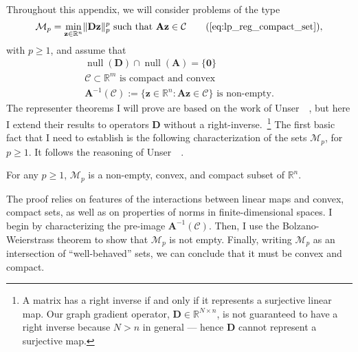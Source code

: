 Throughout this appendix, we will consider problems of the type
\begin{equation}
    \mathcal{M}_p = \underset{\mathbf{z} \in \mathbb{R}^{n}}{\min} \| \mathbf{D z} \|_p^p \text{ such that } \mathbf{Az} \in \mathcal{C} \tag{\ref{eq:lp_reg_compact_set}},
\end{equation}
with $p \geq 1$, and assume that
\begin{align}
    \tag{A1} \label{ass:representer_null} \operatorname{null} \left ( \mathbf{D} \right ) \cap \operatorname{null} \left ( \mathbf{A} \right ) = \{ \mathbf{0} \}\\
    \tag{A2} \label{ass:representer_compact_convex} \mathcal{C} \subset \mathbb{R}^{m} \text{ is compact and convex} \\
    \tag{A3} \label{ass:representer_feasible} \mathbf{A}^{-1}(\mathcal{C}) := \{\mathbf{z} \in \mathbb{R}^{n}: \mathbf{Az} \in \mathcal{C}\} \text{ is non-empty}.
\end{align}
The representer theorems I will prove are based on the work of Unser~\etal~\cite{unser2016}, but here I extend their results to operators $\mathbf{D}$ without a right-inverse.~\footnote{A matrix has a right inverse if and only if it represents a surjective linear map. Our graph gradient operator, $\mathbf{D} \in \mathbb{R}^{N \times n}$, is not guaranteed to have a right inverse because $N > n$ in general --- hence $\mathbf{D}$ cannot represent a surjective map.} The first basic fact that I need to establish is the following characterization of the sets $\mathcal{M}_p$, for $p \geq 1$. It follows the reasoning of Unser~\etal~\cite[Lemma 20]{unser2016}.

\begin{lemma}\label{lem:nonempty-convex-compact}
    For any $p \geq 1$, $\mathcal{M}_p$ is a non-empty, convex, and compact subset of $\mathbb{R}^{n}$.
\end{lemma}

The proof relies on features of the interactions between linear maps and convex, compact sets, as well as on properties of norms in finite-dimensional spaces. I begin by characterizing the pre-image $\mathbf{A}^{-1}(\mathcal{C})$. Then, I use the Bolzano-Weierstrass theorem to show that $\mathcal{M}_p$ is not empty. Finally, writing $\mathcal{M}_p$ as an intersection of ``well-behaved'' sets, we can conclude that it must be convex and compact.

